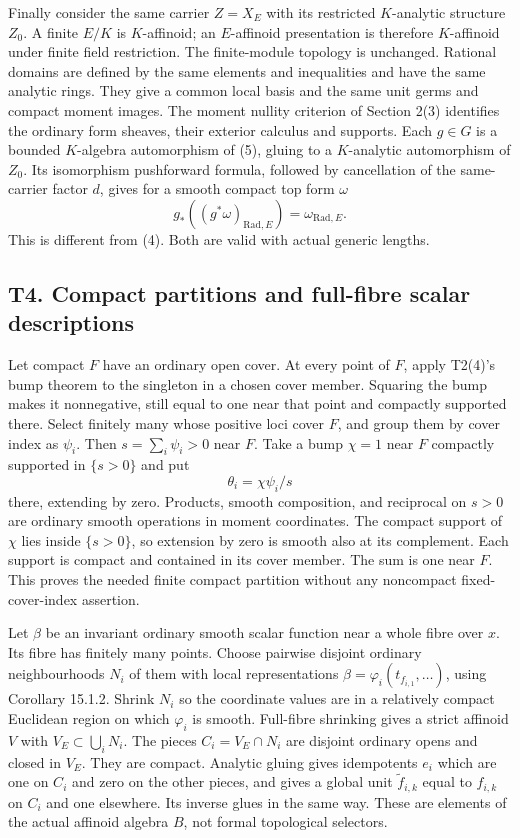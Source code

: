 \documentclass[
  10pt,
]{article}
\begin{document}
Finally consider the same carrier \(Z=X_E\) with its restricted
\(K\)-analytic structure \(Z_0\). A finite \(E/K\) is \(K\)-affinoid; an
\(E\)-affinoid presentation is therefore \(K\)-affinoid under finite
field restriction. The finite-module topology is unchanged. Rational
domains are defined by the same elements and inequalities and have the
same analytic rings. They give a common local basis and the same unit
germs and compact moment images. The moment nullity criterion of Section
2(3) identifies the ordinary form sheaves, their exterior calculus and
supports. Each \(g\in G\) is a bounded \(K\)-algebra automorphism of
(5), gluing to a \(K\)-analytic automorphism of \(Z_0\). Its isomorphism
pushforward formula, followed by cancellation of the same-carrier factor
\(d\), gives for a smooth compact top form \(\omega\) \[
             g_*((g^*\omega)_{\mathrm{Rad},E})
                            =\omega_{\mathrm{Rad},E}.    \tag{6}
\] This is different from (4). Both are valid with actual generic
lengths.

\subsection{T4. Compact partitions and full-fibre scalar
descriptions}\label{t4.-compact-partitions-and-full-fibre-scalar-descriptions}

Let compact \(F\) have an ordinary open cover. At every point of \(F\),
apply T2(4)'s bump theorem to the singleton in a chosen cover member.
Squaring the bump makes it nonnegative, still equal to one near that
point and compactly supported there. Select finitely many whose positive
loci cover \(F\), and group them by cover index as \(\psi_i\). Then
\(s=\sum_i\psi_i>0\) near \(F\). Take a bump \(\chi=1\) near \(F\)
compactly supported in \(\{s>0\}\) and put \[
                \theta_i=\chi\psi_i/s                  \tag{7}
\] there, extending by zero. Products, smooth composition, and
reciprocal on \(s>0\) are ordinary smooth operations in moment
coordinates. The compact support of \(\chi\) lies inside \(\{s>0\}\), so
extension by zero is smooth also at its complement. Each support is
compact and contained in its cover member. The sum is one near \(F\).
This proves the needed finite compact partition without any noncompact
fixed-cover-index assertion.

Let \(\beta\) be an invariant ordinary smooth scalar function near a
whole fibre over \(x\). Its fibre has finitely many points. Choose
pairwise disjoint ordinary neighbourhoods \(N_i\) of them with local
representations \(\beta=\varphi_i(t_{f_{i,1}},\ldots)\), using Corollary
15.1.2. Shrink \(N_i\) so the coordinate values are in a relatively
compact Euclidean region on which \(\varphi_i\) is smooth. Full-fibre
shrinking gives a strict affinoid \(V\) with \(V_E\subset\bigcup_iN_i\).
The pieces \(C_i=V_E\cap N_i\) are disjoint ordinary opens and closed in
\(V_E\). They are compact. Analytic gluing gives idempotents \(e_i\)
which are one on \(C_i\) and zero on the other pieces, and gives a
global unit \(\widetilde f_{i,k}\) equal to \(f_{i,k}\) on \(C_i\) and
one elsewhere. Its inverse glues in the same way. These are elements of
the actual affinoid algebra \(B\), not formal topological selectors.
\end{document}

